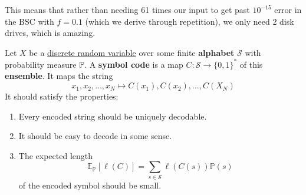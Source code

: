     This means that rather than needing 61 times our input to get past $10^{-15}$ error in the BSC with $f = 0.1$ (which we derive through repetition), we only need 2 disk drives, which is amazing. 


    \begin{definition}
      \label{def:symbol-code}
      Let $X$ be a \hyperref[prob-def:discrete-random-variable]{discrete random variable} over some finite \textbf{alphabet} $\mathcal{S}$ with probability measure $\mathbb{P}$. A \textbf{symbol code} is a map $C: \mathcal{S} \rightarrow \{0, 1\}^\ast$ of this \textbf{ensemble}. It maps the string 
      \begin{equation}
        x_1, x_2, \ldots, x_N \mapsto C(x_1), C(x_2), \ldots, C(X_N)
      \end{equation}
      It should satisfy the properties: 
      \begin{enumerate}
        \item Every encoded string should be uniquely decodable. 
        \item It should be easy to decode in some sense. 
        \item The expected length 
          \begin{equation}
            \mathbb{E}_{\mathbb{P}} [\ell(C)] = \sum_{s \in \mathcal{S}} \ell(C(s)) \mathbb{P}(s)
          \end{equation}
          of the encoded symbol should be small. 
      \end{enumerate}
    \end{definition}

